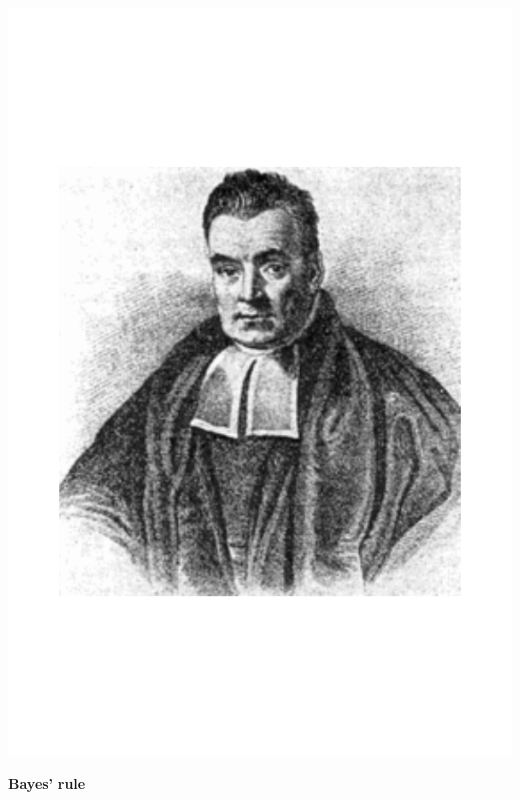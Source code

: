 \documentclass[notes,blackandwhite,mathsans]{beamer}
\begin{document}
\begin{frame}

\centering
\includegraphics[scale=0.5, trim= 2cm 2cm 2cm 2cm]{grphs/Bayes.pdf}

\Large\textbf{\color{mcxs3} Bayes'} \textbf{\color{mcxs2}rule}

\end{frame}
\end{document}
